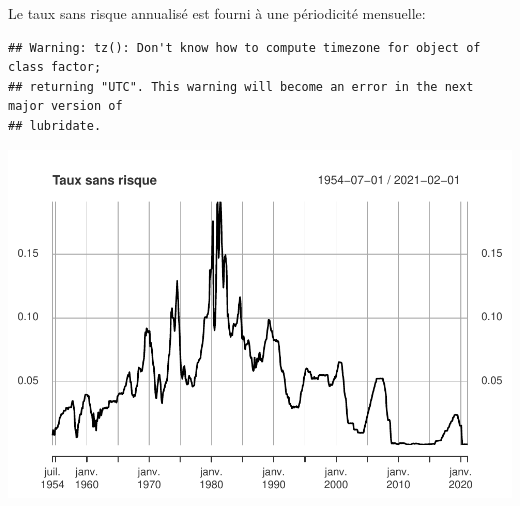 \documentclass[
]{article}
\newenvironment{Shaded}{\begin{snugshade}}{\end{snugshade}}
\newcommand{\AttributeTok}[1]{\textcolor[rgb]{0.77,0.63,0.00}{#1}}
\newcommand{\CommentTok}[1]{\textcolor[rgb]{0.56,0.35,0.01}{\textit{#1}}}
\newcommand{\ConstantTok}[1]{\textcolor[rgb]{0.00,0.00,0.00}{#1}}
\newcommand{\ControlFlowTok}[1]{\textcolor[rgb]{0.13,0.29,0.53}{\textbf{#1}}}
\newcommand{\DecValTok}[1]{\textcolor[rgb]{0.00,0.00,0.81}{#1}}
\newcommand{\FloatTok}[1]{\textcolor[rgb]{0.00,0.00,0.81}{#1}}
\newcommand{\FunctionTok}[1]{\textcolor[rgb]{0.00,0.00,0.00}{#1}}
\newcommand{\NormalTok}[1]{#1}
\newcommand{\OtherTok}[1]{\textcolor[rgb]{0.56,0.35,0.01}{#1}}
\newcommand{\SpecialCharTok}[1]{\textcolor[rgb]{0.00,0.00,0.00}{#1}}
\newcommand{\StringTok}[1]{\textcolor[rgb]{0.31,0.60,0.02}{#1}}
\begin{document}
Le taux sans risque annualisé est fourni à une périodicité mensuelle:

\begin{Shaded}
\end{Shaded}

\begin{verbatim}
## Warning: tz(): Don't know how to compute timezone for object of class factor;
## returning "UTC". This warning will become an error in the next major version of
## lubridate.
\end{verbatim}

\begin{Shaded}
\end{Shaded}

\includegraphics{TP-7-v2_files/figure-latex/unnamed-chunk-4-1.pdf}
\end{document}
